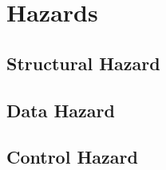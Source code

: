 \section{Hazards}

\subsection{Structural Hazard}
\subsection{Data Hazard}
\subsection{Control Hazard}
